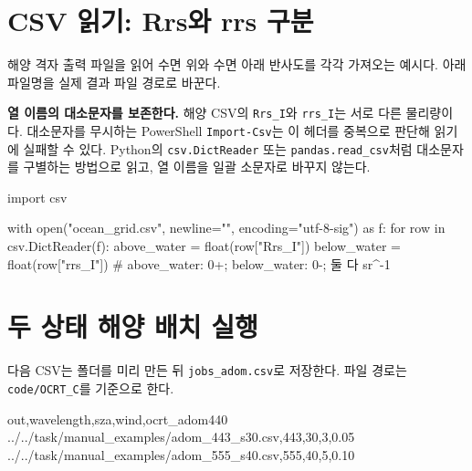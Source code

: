 \section{CSV 읽기: Rrs와 rrs 구분}
\label{sec:auto:04_examples:15}

\label{sec:example_csv_reader}

해양 격자 출력 파일을 읽어 수면 위와 수면 아래 반사도를 각각 가져오는 예시다. 아래 파일명을 실제 결과 파일 경로로 바꾼다.

\textbf{열 이름의 대소문자를 보존한다.} 해양 CSV의 \texttt{Rrs\_\allowbreak{}I}와 \texttt{rrs\_\allowbreak{}I}는 서로 다른 물리량이다. 대소문자를 무시하는 PowerShell \texttt{Import-\allowbreak{}Csv}는 이 헤더를 중복으로 판단해 읽기에 실패할 수 있다. Python의 \texttt{csv.\allowbreak{}DictReader} 또는 \texttt{pandas.\allowbreak{}read\_\allowbreak{}csv}처럼 대소문자를 구별하는 방법으로 읽고, 열 이름을 일괄 소문자로 바꾸지 않는다.

\par\noindent\begin{minipage}{\linewidth}
\begin{ManualCode}
import csv

with open("ocean_grid.csv", newline="", encoding="utf-8-sig") as f:
    for row in csv.DictReader(f):
        above_water = float(row["Rrs_I"])
        below_water = float(row["rrs_I"])
        # above_water: 0+; below_water: 0-; 둘 다 sr^-1
\end{ManualCode}
\end{minipage}\par

\section{두 상태 해양 배치 실행}
\label{sec:auto:04_examples:16}

\label{sec:example_input_batch}

다음 CSV는 폴더를 미리 만든 뒤 \texttt{jobs\_\allowbreak{}adom.\allowbreak{}csv}로 저장한다. 파일 경로는 \texttt{code/\allowbreak{}OCRT\_\allowbreak{}C}를 기준으로 한다.


\par\noindent\begin{minipage}{\linewidth}
\begin{ManualCode}
out,wavelength,sza,wind,ocrt_adom440
../../task/manual_examples/adom_443_s30.csv,443,30,3,0.05
../../task/manual_examples/adom_555_s40.csv,555,40,5,0.10
\end{ManualCode}
\end{minipage}\par



